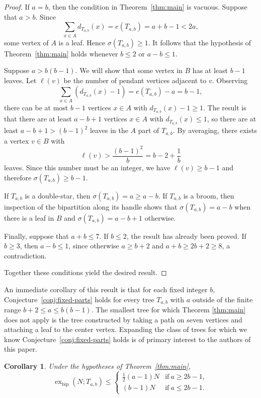 \documentclass[12pt]{article}
\newtheorem{corollary}[theorem]{Corollary}
\theoremstyle{definition}
\theoremstyle{remark}
\newcommand{\exbip}{\operatorname{ex}_{\mathrm{bip}}}
\begin{document}
\begin{proof}

If $a=b$, then the condition in Theorem~\ref{thm:main} is vacuous.
Suppose that $a>b$. Since
\[
    \sum_{ x\in A}d_{T_{a,b}}(x)=e(T_{a,b})=a+b-1<2a,
\]
some vertex of $A$ is a leaf. Hence $\sigma(T_{a,b})\geq 1$.
It follows that the hypothesis of Theorem~\ref{thm:main} holds
whenever $b\leq 2$ or $a-b\leq 1$. 

Suppose $a>b(b-1)$. We will show that some vertex in $B$ has at least $b-1$ leaves. Let $\ell(v)$ be the number of pendant vertices adjacent to $v$. Observing
\[
\sum_{x\in A}(d_{T_{a,b}}(x)-1)=e(T_{a,b})-a=b-1,
\]
there can be at most $b-1$ vertices $x\in A$ with $d_{T_{a,b}}(x)-1\geq 1$. The result is that there are at least $a-b+1$ vertices $x\in A$ with $d_{T_{a,b}}(x)\leq1$, so there are at least $a-b+1>(b-1)^2$ leaves in the $A$ part of $T_{a,b}$. By averaging, there exists a vertex $v\in B$ with
\[
\ell(v)>\frac{(b-1)^2}{b}=b-2+\frac{1}{b}
\]
leaves. Since this number must be an integer, we have $\ell(v)\geq b-1$ and therefore $\sigma(T_{a,b})\geq b-1$.

If $T_{a,b}$ is a double-star, then $\sigma(T_{a,b})=a\geq a-b$. If $T_{a,b}$ is a broom, then inspection of the bipartition along
its handle shows that $\sigma(T_{a,b})=a-b$ when there is a leaf in $B$ and $\sigma(T_{a,b})=a-b+1$ otherwise.

Finally, suppose that $a+b\leq 7$. If $b\leq 2$, the result has
already been proved. If $b\geq 3$, then $a-b\leq 1$, since otherwise
$a\geq b+2$ and $a+b\geq 2b+2\geq 8$, a contradiction.

Together these conditions yield the desired result.
\end{proof}

An immediate corollary of this result is that for each fixed integer $b$, Conjecture~\ref{conj:fixed-parts} holds for every tree $T_{a,b}$ with $a$ outside of the finite range $b+2\leq a\leq b(b-1)$. The smallest tree for which Theorem \ref{thm:main} does not apply is the tree constructed by taking a path on seven vertices and attaching a leaf to the center vertex. Expanding the class of trees for which we know Conjecture~\ref{conj:fixed-parts} holds is of primary interest to the authors of this paper.



\begin{corollary}
\label{cor:order-main}
Under the hypotheses of Theorem~\ref{thm:main},
\[
    \exbip(N;T_{a,b})\le\begin{cases}
        \frac12(a-1)N&\text{if}\ a\geq2b-1,\\
        (b-1)N&\text{if}\ a\leq2b-1.
    \end{cases}
\]
\end{corollary}
\end{document}
